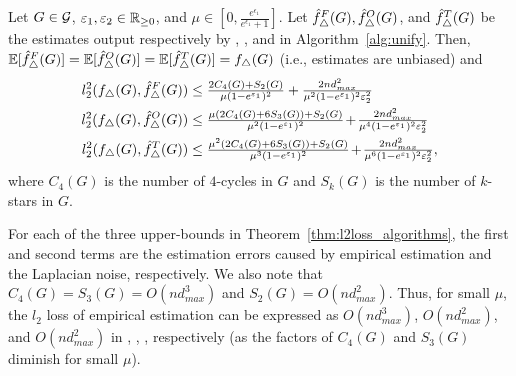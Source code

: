 \begin{theorem}\label{thm:l2loss_algorithms}
  Let $G \in \mathcal{G}$, $\varepsilon_1, \varepsilon_2 \in \mathbb{R}_{\ge0}$, and
  $\mu \in [0,\frac{e^{\epsilon_1}}{e^{\epsilon_1} + 1}]$.
  Let $\hat{f}_\triangle^F(G), \hat{f}_\triangle^O(G)$,
  and $\hat{f}_\triangle^T(G)$ be
  the
  estimates output
  respectively by \AlgOne{}, \AlgTwo{}, and \AlgThree{} in Algorithm~\ref{alg:unify}.
  Then, $\mathbb{E}[\hat{f}_\triangle^F(G)] = \mathbb{E}[\hat{f}_\triangle^O(G)] = \mathbb{E}[\hat{f}_\triangle^T(G)] = f_\triangle(G)$ (i.e., estimates are unbiased) and
   \begin{align*}
      l_2^2(f_\triangle(G), \hat{f}_\triangle^F(G)) &\leq \textstyle{\frac{2C_4(G)+S_2(G)}{\mu(1-e^{\varepsilon_1})^2} + \frac{2nd_{max}^2}{\mu^2(1-e^{\varepsilon_1})^2\varepsilon_2^2}} \\
      l_2^2(f_\triangle(G), \hat{f}_\triangle^O(G)) &\leq \textstyle{\frac{\mu(2 C_4(G) + 6S_3(G)) + S_2(G)}{\mu^2(1-e^{\varepsilon_1})^2} \hspace{-0.5mm}+\hspace{-0.5mm} \frac{2nd_{max}^2}{\mu^4(1-e^{\varepsilon_1})^2\varepsilon_2^2}}\\
      l_2^2(f_\triangle(G), \hat{f}_\triangle^T(G)) &\leq \textstyle{\frac{\mu^2(2 C_4(G) + 6S_3(G)) + S_2(G)}{\mu^3(1-e^{\varepsilon_1})^2} \hspace{-0.5mm}+\hspace{-0.5mm} \frac{2nd_{max}^2}{\mu^6(1-e^{\varepsilon_1})^2\varepsilon_2^2},}
   \end{align*}
   where $C_4(G)$ is the number of $4$-cycles in $G$
   and $S_k(G)$ is the number of $k$-stars in $G$. %
\end{theorem}
For each of the three upper-bounds in Theorem~\ref{thm:l2loss_algorithms}, the first and second terms are the estimation errors caused by empirical estimation and the Laplacian noise, respectively.
We also note that
$C_4(G) = S_3(G) = O(n d_{max}^3)$
and $S_2(G) = O(n d_{max}^2)$.
Thus, for small
$\mu$,
the $l_2$ loss of empirical estimation can be expressed as $O(n d_{max}^3)$, $O(n d_{max}^2)$, and $O(n d_{max}^2)$ in \AlgOne{}, \AlgTwo{}, \AlgThree{}, respectively
(as the factors of $C_4(G)$ and $S_3(G)$
diminish for small $\mu$).

